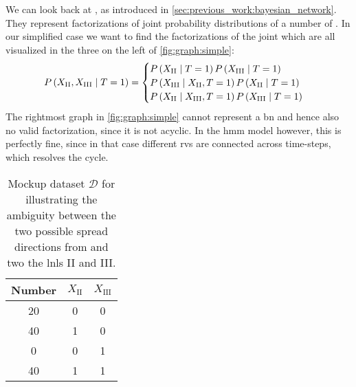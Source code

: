 \documentclass[\relativeRoot/main.tex]{subfiles}
\begin{document}
We can look back at , as introduced in \cref{sec:previous_work:bayesian_network}. They represent factorizations of joint probability distributions of a number of . In our simplified case we want to find the factorizations of the joint which are all visualized in the three  on the left of \cref{fig:graph:simple}:
%
\begin{equation}
    P \left( X_\text{II}, X_\text{III} \mid T=1 \right) = \begin{cases}
        P \left( X_\text{II} \mid T=1 \right) P \left( X_\text{III} \mid T=1 \right) \\
        P \left( X_\text{III} \mid X_\text{II}, T=1 \right) P \left( X_\text{II} \mid T=1 \right) \\
        P \left( X_\text{II} \mid X_\text{III}, T=1 \right) P \left( X_\text{III} \mid T=1 \right)
    \end{cases}
\end{equation}
%
The rightmost graph in \cref{fig:graph:simple} cannot represent a \gls{bn} and hence also no valid factorization, since it is not acyclic. In the \gls{hmm} model however, this is perfectly fine, since in that case different \glspl{rv} are connected across time-steps, which resolves the cycle.

\begin{table}
    \centering
    \begin{tabular}{|c|cc|}
        \hline
        Number & $X_\text{II}$ & $X_\text{III}$ \\
        \hline
        20 & 0 & 0 \\
        40 & 1 & 0 \\
         0 & 0 & 1 \\
        40 & 1 & 1 \\
        \hline
    \end{tabular}
    \caption{Mockup dataset $\boldsymbol{\mathcal{D}}$ for illustrating the ambiguity between the two possible spread directions from and two the \glspl{lnl} II and III.}
    \label{table:graph:simple:mockup}
\end{table}
\end{document}
